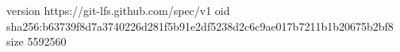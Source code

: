 version https://git-lfs.github.com/spec/v1
oid sha256:b63739f8d7a3740226d281f5b91e2df5238d2c6c9ae017b7211b1b20675b2bf8
size 5592560
